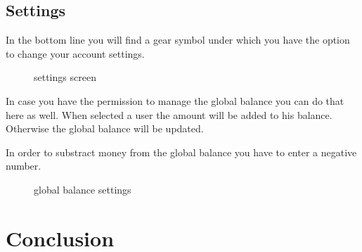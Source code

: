 \subsection{Settings}\label{settings-2}

In the bottom line you will find a gear symbol under which you have the
option to change your account settings.

\begin{figure}[htbp]
\centering
{}
\caption{settings screen}
\end{figure}

In case you have the permission to manage the global balance you can do
that here as well. When selected a user the amount will be added to his
balance. Otherwise the global balance will be updated.

In order to substract money from the global balance you have to enter a
negative number.

\begin{figure}[htbp]
\centering
{}
\caption{global balance settings}
\end{figure}

\newpage
\section{Conclusion}\label{conclusion}


